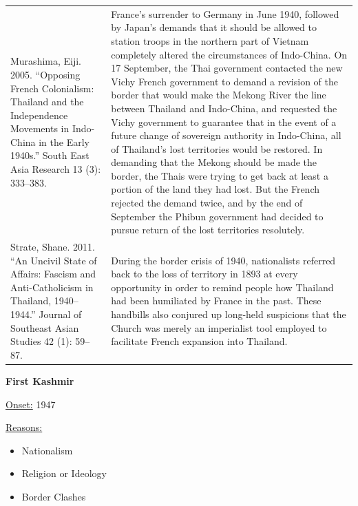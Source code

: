 {\begin{longtable}{p{}p{}}
\\
Murashima, Eiji. 2005. “Opposing French Colonialism: Thailand and the Independence Movements in Indo-China in the Early 1940s.” South East Asia Research 13 (3): 333–383. & France's surrender to Germany in June 1940, followed by Japan's demands that it should be allowed to station troops in the northern part of Vietnam completely altered the circumstances of Indo-China. On 17 September, the Thai government contacted the new Vichy French government to demand a revision of the border that would make the Mekong River the line between Thailand and Indo-China, and requested the Vichy government to guarantee that in the event of a future change of sovereign authority in Indo-China, all of Thailand's lost territories would be restored. In demanding that the Mekong should be made the border, the Thais were trying to get back at least a portion of the land they had lost. But the French rejected the demand twice, and by the end of September the Phibun government had decided to pursue return of the lost territories resolutely.
\\
Strate, Shane. 2011. “An Uncivil State of Affairs: Fascism and Anti-Catholicism in Thailand, 1940–1944.” Journal of Southeast Asian Studies 42 (1): 59–87. & During the border crisis of 1940, nationalists referred back to the loss of territory in 1893 at every opportunity in order to remind people how Thailand had been humiliated by France in the past. These handbills also conjured up long-held suspicions that the Church was merely an imperialist tool employed to facilitate French expansion into Thailand.
\\
\end{longtable}}
\clearpage
         \textbf{First Kashmir} 

          \underline{Onset:} 1947         

\underline{Reasons:}
\begin{itemize}
\item Nationalism
\item Religion or Ideology
\item Border Clashes
\end{itemize}

